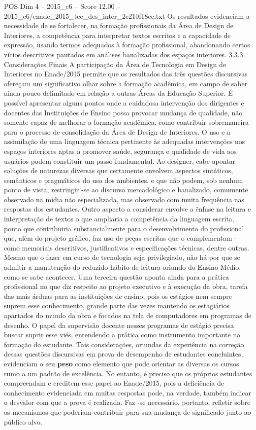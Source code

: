 \begin{textsample}{POS Dim 4 – 2015\_c6 – Score 12.00 – 2015\_c6/enade\_2015\_tec\_des\_inter\_2e210f18ec.txt}
Os resultados evidenciam a necessidade de se fortalecer, na formação profissionais da Área de Design de Interiores, a competência para interpretar textos escritos e a capacidade de expressão, usando termos adequados à formação profissional, abandonando certos vícios descritivos pautados em análises banalizadas dos espaços interiores. 3.3.3 Considerações Finais A participação da Área de Tecnologia em Design de Interiores no Enade/2015 permite que os resultados das três questões discursivas ofereçam um significativo olhar sobre a formação acadêmica, em campo de saber ainda pouco delimitado em relação a outras Áreas da Educação Superior.
É possível apresentar alguns pontos onde a cuidadosa intervenção dos dirigentes e docentes das Instituições de Ensino possa provocar mudança de qualidade, não somente capaz de melhorar a formação acadêmica, como contribuir sobremaneira para o processo de consolidação da Área de Design de Interiores.
O uso e a assimilação de uma linguagem técnica pertinente às adequadas intervenções nos espaços interiores aptas a promover saúde, segurança e qualidade de vida aos usuários podem constituir um passo fundamental.
Ao designer, cabe apontar soluções de naturezas diversas que certamente envolvem aspectos sintáticos, semânticos e pragmáticos do uso dos ambientes, e que não podem, sob nenhum ponto de vista, restringir -se ao discurso mercadológico e banalizado, comumente observado na mídia não especializada, mas observado com muita frequência nas respostas dos estudantes.
Outro aspecto a considerar envolve a ênfase na leitura e interpretação de textos o que ampliaria a competência da linguagem escrita, ponto que contribuiria substancialmente para o desenvolvimento do profissional que, além do projeto gráfico, faz uso de peças escritas que o complementam - como memoriais descritivos, justificativos e especificações técnicas, dentre outras.
Mesmo que o fazer em curso de tecnologia seja privilegiado, não há por que se admitir a manutenção do reduzido hábito de leitura oriundo do Ensino Médio, como se sabe acontecer.
Uma terceira questão aponta ainda para a prática profissional no que diz respeito ao projeto executivo e à execução da obra, tarefa das mais árduas para as instituições de ensino, pois os estágios nem sempre suprem esse conhecimento, grande parte das vezes mantendo os estagiários apartados do mundo da obra e focados na tela de computadores em programas de desenho.
O papel da supervisão docente nesses programas de estágio precisa buscar suprir esse viés, entendendo a prática como instrumento importante na formação do estudante.
Tais considerações, oriundas da experiência na correção dessas questões discursivas em prova de desempenho de estudantes concluintes, evidenciam o seu \textbf{peso} como elemento que pode orientar as diversas os cursos rumo a um padrão de excelência.
No entanto, é preciso que os próprios estudantes compreendam e creditem esse papel ao Enade/2015, pois a deficiência de conhecimento evidenciada em muitas respostas pode, na verdade, também indicar o desvalor com que a prova é realizada.
Faz -se necessário, portanto, refletir sobre os mecanismos que poderiam contribuir para sua mudança de significado junto ao público alvo.


\end{textsample}
